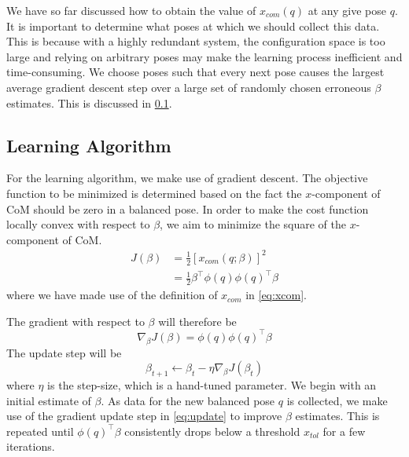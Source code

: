 \documentclass[letterpaper, 10 pt, conference]{ieeeconf}  %
\begin{document}
We have so far discussed how to obtain the value of $x_{com}(q)$ at any give pose $q$. It is important to determine what poses at which we should collect this data. This is because with a highly redundant system, the configuration space is too large and relying on arbitrary poses may make the learning process inefficient and time-consuming. We choose poses such that every next pose causes the largest average gradient descent step over a large set of randomly chosen erroneous $\beta$ estimates. This is discussed in \cref{subsec: learning}.


\subsection{Learning Algorithm} \label{subsec: learning}

For the learning algorithm, we make use of gradient descent. The objective function to be minimized is determined based on the fact the $x$-component of CoM should be zero in a balanced pose. In order to make the cost function locally convex with respect to $\beta$, we aim to minimize the square of the $x$-component of CoM.
\begin{align}
    J(\beta) &= \tfrac{1}{2} \left[ x_{com}(q; \beta) \right]^2 \nonumber \\
    &= \tfrac{1}{2} \beta^\top \phi(q) \phi(q)^\top \beta
\end{align}
where we have made use of the definition of $x_{com}$ in \eqref{eq:xcom}.

The gradient with respect to $\beta$ will therefore be
\begin{equation}
    \nabla_\beta J(\beta) = \phi(q) \phi(q)^\top \beta
\end{equation}
The update step will be
\begin{equation}
    \beta_{t+1} \leftarrow \beta_t - \eta \nabla_\beta J(\beta_t) \label{eq:update}
\end{equation}
where $\eta$ is the step-size, which is a hand-tuned parameter. We begin with an initial estimate of $\beta$. As data for the new balanced pose $q$ is collected, we make use of the gradient update step in \eqref{eq:update} to improve $\beta$ estimates. This is repeated until $\phi(q)^\top \beta$ consistently drops below a threshold $x_{tol}$ for a few iterations.
\end{document}
